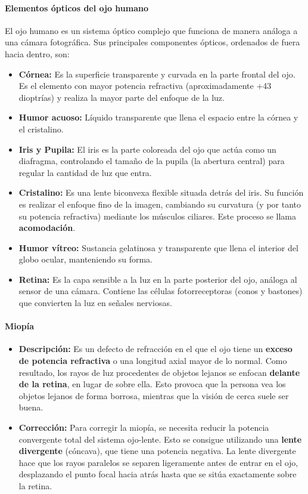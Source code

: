 \paragraph*{Elementos ópticos del ojo humano}
El ojo humano es un sistema óptico complejo que funciona de manera análoga a una cámara fotográfica. Sus principales componentes ópticos, ordenados de fuera hacia dentro, son:
\begin{itemize}
    \item \textbf{Córnea:} Es la superficie transparente y curvada en la parte frontal del ojo. Es el elemento con mayor potencia refractiva (aproximadamente +43 dioptrías) y realiza la mayor parte del enfoque de la luz.
    \item \textbf{Humor acuoso:} Líquido transparente que llena el espacio entre la córnea y el cristalino.
    \item \textbf{Iris y Pupila:} El iris es la parte coloreada del ojo que actúa como un diafragma, controlando el tamaño de la pupila (la abertura central) para regular la cantidad de luz que entra.
    \item \textbf{Cristalino:} Es una lente biconvexa flexible situada detrás del iris. Su función es realizar el enfoque fino de la imagen, cambiando su curvatura (y por tanto su potencia refractiva) mediante los músculos ciliares. Este proceso se llama \textbf{acomodación}.
    \item \textbf{Humor vítreo:} Sustancia gelatinosa y transparente que llena el interior del globo ocular, manteniendo su forma.
    \item \textbf{Retina:} Es la capa sensible a la luz en la parte posterior del ojo, análoga al sensor de una cámara. Contiene las células fotorreceptoras (conos y bastones) que convierten la luz en señales nerviosas.
\end{itemize}

\paragraph*{Miopía}
\begin{itemize}
    \item \textbf{Descripción:} Es un defecto de refracción en el que el ojo tiene un \textbf{exceso de potencia refractiva} o una longitud axial mayor de lo normal. Como resultado, los rayos de luz procedentes de objetos lejanos se enfocan \textbf{delante de la retina}, en lugar de sobre ella. Esto provoca que la persona vea los objetos lejanos de forma borrosa, mientras que la visión de cerca suele ser buena.
    \item \textbf{Corrección:} Para corregir la miopía, se necesita reducir la potencia convergente total del sistema ojo-lente. Esto se consigue utilizando una \textbf{lente divergente} (cóncava), que tiene una potencia negativa. La lente divergente hace que los rayos paralelos se separen ligeramente antes de entrar en el ojo, desplazando el punto focal hacia atrás hasta que se sitúa exactamente sobre la retina.
\end{itemize}

